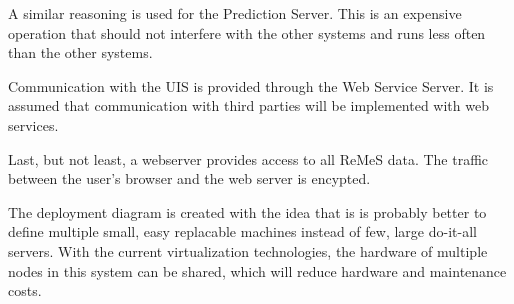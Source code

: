 \npar A similar reasoning is used for the Prediction Server. This is an
expensive operation that should not interfere with the other systems and runs
less often than the other systems.

\npar Communication with the UIS is provided through the Web Service Server. It
is assumed that communication with third parties will be implemented with web
services. 

\npar Last, but not least, a webserver provides access to all ReMeS data. The
traffic between the user's browser and the web server is encypted.

\npar The deployment diagram is created with the idea that is is probably better
to define multiple small, easy replacable machines instead of few, large
do-it-all servers. With the current virtualization technologies, the hardware of
multiple nodes in this system can be shared, which will reduce hardware and
maintenance costs.